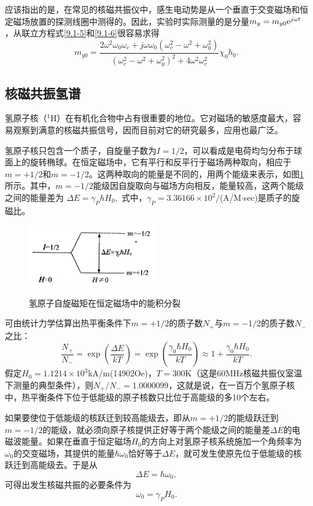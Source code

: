 \documentclass[a4paper]{article}
\begin{document}
应该指出的是，在常见的核磁共振仪中，感生电动势是从一个垂直于交变磁场和恒定磁场放置的探测线圈中测得的。因此，实验时实际测量的是分量$m_y=m_{y0}{\rm e}^{j\omega t}$，从联立方程式\ref{9.1-5}和\ref{9.1-6}很容易求得
\begin{equation}m_{y0}=\frac{2\omega^2\omega_0\omega_c+j\omega\omega_0(\omega_c^2-\omega^2+\omega_0^2)}{(\omega_c^2-\omega^2+\omega_0^2)^2+4\omega^2\omega_c^2}\chi_0h_0.\label{9.1-12}\end{equation}

\subsection{核磁共振氢谱}
氢原子核（$^1$H）在有机化合物中占有很重要的地位。它对磁场的敏感度最大，容易观察到满意的核磁共振信号，因而目前对它的研究最多，应用也最广泛。

氢原子核只包含一个质子，自旋量子数为$I=1/2$，可以看成是电荷均匀分布于球面上的旋转椭球。在恒定磁场中，它有平行和反平行于磁场两种取向，相应于$m=+1/2$和$m=-1/2$。这两种取向的能量是不同的，用两个能级来表示，如图\ref{Fig2}所示。其中，$m=-1/2$能级因自旋取向与磁场方向相反，能量较高，这两个能级之间的能量差为
$\Delta E=\gamma_P\hbar H_0,$
式中，$\gamma_P=3.36166\times 10^2/$(A/M$\cdot$sec)是质子的旋磁比。

\begin{figure}[H]
\centering
\includegraphics[width = 0.5\textwidth]{fig/2.png}\\
\caption{氢原子自旋磁矩在恒定磁场中的能积分裂}
\label{Fig2}
\end{figure}

可由统计力学估算出热平衡条件下$m=+1/2$的质子数$N_+$与$m=-1/2$的质子数$N_-$之比：
\begin{equation}\frac{N_+}{N_-}=\exp\left(\frac{\Delta E}{kT}\right)=\exp\left(\frac{\gamma_0\hbar H_0}{kT}\right)\approx 1+\frac{\gamma_0 \hbar H_0}{kT}.\label{9.1-13}\end{equation}
假定$H_0=1.1214\times 10^3$kA/m(14902Oe)，$T=300$K（这是60MHz核磁共振仪室温下测量的典型条件），则$N_+/N_-=1.0000099$，这就是说，在一百万个氢原子核中，热平衡条件下位于低能级的原子核数只比位于高能级的多10个左右。

如果要使位于低能级的核跃迁到较高能级去，即从$m=+1/2$的能级跃迁到$m=-1/2$的能级，就必须向原子核提供正好等于两个能级之间的能量差$\Delta E$的电磁波能量。如果在垂直于恒定磁场$H_0$的方向上对氢原子核系统施加一个角频率为$\omega_0$的交变磁场，其提供的能量$\hbar\omega_0$恰好等于$\Delta E$，就可发生使原先位于低能级的核跃迁到高能级去。于是从
$$\Delta E=\hbar\omega_0,$$
可得出发生核磁共振的必要条件为
\begin{equation}\omega_0=\gamma_PH_0.\label{9.1-14}\end{equation}
\end{document}
